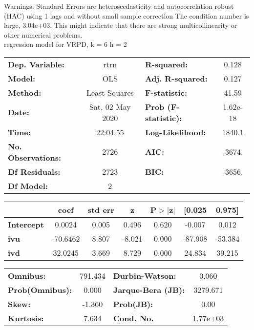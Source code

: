 Warnings: \newline
 [1] Standard Errors are heteroscedasticity and autocorrelation robust (HAC) using 1 lags and without small sample correction \newline
 [2] The condition number is large, 3.04e+03. This might indicate that there are \newline
 strong multicollinearity or other numerical problems.\\ 

regression model for VRPD, k = 6 h = 2\begin{center}
\begin{tabular}{lclc}
\toprule
\textbf{Dep. Variable:}    &       rtrn       & \textbf{  R-squared:         } &     0.128   \\
\textbf{Model:}            &       OLS        & \textbf{  Adj. R-squared:    } &     0.127   \\
\textbf{Method:}           &  Least Squares   & \textbf{  F-statistic:       } &     41.59   \\
\textbf{Date:}             & Sat, 02 May 2020 & \textbf{  Prob (F-statistic):} &  1.62e-18   \\
\textbf{Time:}             &     22:04:55     & \textbf{  Log-Likelihood:    } &    1840.1   \\
\textbf{No. Observations:} &        2726      & \textbf{  AIC:               } &    -3674.   \\
\textbf{Df Residuals:}     &        2723      & \textbf{  BIC:               } &    -3656.   \\
\textbf{Df Model:}         &           2      & \textbf{                     } &             \\
\bottomrule
\end{tabular}
\begin{tabular}{lcccccc}
                   & \textbf{coef} & \textbf{std err} & \textbf{z} & \textbf{P$> |$z$|$} & \textbf{[0.025} & \textbf{0.975]}  \\
\midrule
\textbf{Intercept} &       0.0024  &        0.005     &     0.496  &         0.620        &       -0.007    &        0.012     \\
\textbf{ivu}       &     -70.6462  &        8.807     &    -8.021  &         0.000        &      -87.908    &      -53.384     \\
\textbf{ivd}       &      32.0245  &        3.669     &     8.729  &         0.000        &       24.834    &       39.215     \\
\bottomrule
\end{tabular}
\begin{tabular}{lclc}
\textbf{Omnibus:}       & 791.434 & \textbf{  Durbin-Watson:     } &    0.060  \\
\textbf{Prob(Omnibus):} &   0.000 & \textbf{  Jarque-Bera (JB):  } & 3279.671  \\
\textbf{Skew:}          &  -1.360 & \textbf{  Prob(JB):          } &     0.00  \\
\textbf{Kurtosis:}      &   7.634 & \textbf{  Cond. No.          } & 1.77e+03  \\
\bottomrule
\end{tabular}
\end{center}

